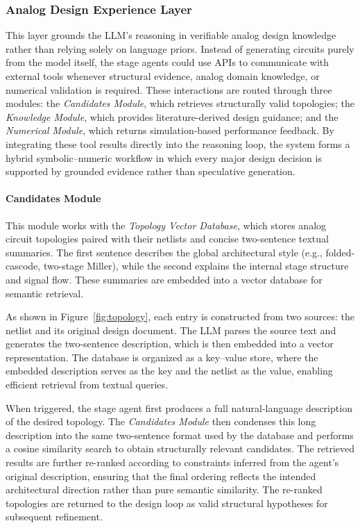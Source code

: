 \subsubsection{Analog Design Experience Layer}


This layer grounds the LLM’s reasoning in verifiable analog design knowledge rather than relying solely on language priors. Instead of generating circuits purely from the model itself, the stage agents could use APIs to communicate with external tools whenever structural evidence, analog domain knowledge, or numerical validation is required. These interactions are routed through three modules: the \emph{Candidates Module}, which retrieves structurally valid topologies; the \emph{Knowledge Module}, which provides literature-derived design guidance; and the \emph{Numerical Module}, which returns simulation-based performance feedback. By integrating these tool results directly into the reasoning loop, the system forms a hybrid symbolic–numeric workflow in which every major design decision is supported by grounded evidence rather than speculative generation.


\paragraph{Candidates Module}
This module works with the \emph{Topology Vector Database}, which stores analog circuit topologies paired with their netlists and concise two-sentence textual summaries. The first sentence describes the global architectural style (e.g., folded-cascode, two-stage Miller), while the second explains the internal stage structure and signal flow. These summaries are embedded into a vector database for semantic retrieval.

As shown in Figure~\ref{fig:topology}, each entry is constructed from two sources: the netlist and its original design document. The LLM parses the source text and generates the two-sentence description, which is then embedded into a vector representation. The database is organized as a key–value store, where the embedded description serves as the key and the netlist as the value, enabling efficient retrieval from textual queries. 

When triggered, the stage agent first produces a full natural-language description of the desired topology. The \emph{Candidates Module} then condenses this long description into the same two-sentence format used by the database and performs a cosine similarity search to obtain structurally relevant candidates. The retrieved results are further re-ranked according to constraints inferred from the agent’s original description, ensuring that the final ordering reflects the intended architectural direction rather than pure semantic similarity. The re-ranked topologies are returned to the design loop as valid structural hypotheses for subsequent refinement.



